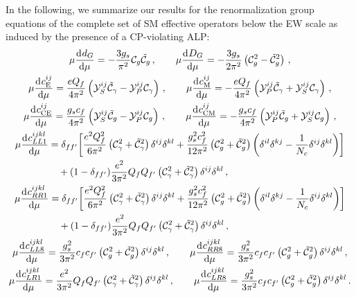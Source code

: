 In the following, we summarize our results for
the renormalization group equations of the complete set of SM effective operators below the EW scale as induced by the presence of a CP-violating ALP:
%
\begin{gather}
    \mu \dv[]{d_G}{\mu} = - \frac{3g_s}{\pi^2}\mathcal{C}_g \tilde{\mathcal{C}}_g\,,
    \qquad
    \mu \dv[]{D_G}{\mu} = -\frac{3g_s}{2\pi^2}\left(\mathcal{C}_g^2 - \tilde{\mathcal{C}}_g^2\right)\,,
    \\
    \mu\dv[]{c_{\rm E}^{ij}}{\mu} =  \frac{e Q_f}{4 \pi^2} \left( \mathcal{Y}_S^{ij} \tilde{\mathcal{C}}_\gamma-\mathcal{Y}_P^{ij} \mathcal{C}_\gamma  \right) \,,
    \qquad
    \mu\dv[]{c_{\rm M}^{ij}}{\mu} = - \frac{e Q_f}{4 \pi^2} \left(\mathcal{Y}_P^{ij} \tilde{\mathcal{C}}_\gamma  + \mathcal{Y}_S^{ij} \mathcal{C}_\gamma\right) \,,
    \\
    \mu\dv[]{c_{\rm CE}^{ij}}{\mu} = \frac{g_s c_f}{4 \pi^2} \left( \mathcal{Y}_S^{ij} \tilde{\mathcal{C}}_g-\mathcal{Y}_P^{ij} \mathcal{C}_g  \right) \,,
    \qquad
    \mu\dv[]{c_{\rm CM}^{ij}}{\mu} = -\frac{g_s c_f}{4 \pi^2} \left(\mathcal{Y}_P^{ij} \tilde{\mathcal{C}}_g  + \mathcal{Y}_S^{ij} \mathcal{C}_g\right) \,,\\
    \begin{aligned}
    \mu\dv[]{c_{LL1}^{ijkl}}{\mu} &=  \delta_{ff'}\bigg[\frac{e^2Q_f^2}{6\pi^2}\left(\mathcal C_\gamma^2 + \tilde{\mathcal C}_\gamma^2\right)\delta^{ij}\delta^{kl}+\frac{g_s^2c_f^2}{12\pi^2}\left(\mathcal C_g^2 + \tilde{\mathcal C}_g^2\right)\bigg(\delta^{il}\delta^{kj}-\frac{1}{N_c}\delta^{ij}\delta^{kl}\bigg) \bigg] \\&\quad + (1-\delta_{ff'})\frac{e^2}{3\pi^2}Q_f Q_{f'}\left(\mathcal C_\gamma^2 + \tilde{\mathcal C}_\gamma^2\right)\delta^{ij}\delta^{kl}\,, 
    \end{aligned}\\
    \begin{aligned}
    \mu\dv[]{c_{RR1}^{ijkl}}{\mu} &= \delta_{ff'}\bigg[\frac{e^2Q_f^2}{6\pi^2}\left(\mathcal C_\gamma^2 + \tilde{\mathcal C}_\gamma^2\right)\delta^{ij}\delta^{kl}+\frac{g_s^2c_f^2}{12\pi^2}\left(\mathcal C_g^2 + \tilde{\mathcal C}_g^2\right)\bigg(\delta^{il}\delta^{kj}-\frac{1}{N_c}\delta^{ij}\delta^{kl}\bigg) \bigg] \\&\quad+ (1-\delta_{ff'})\frac{e^2}{3\pi^2}Q_f Q_{f'}\left(\mathcal C_\gamma^2 + \tilde{\mathcal C}_\gamma^2\right)\delta^{ij}\delta^{kl}\,, 
    \end{aligned}\\
    \mu\dv[]{c_{LL8}^{ijkl}}{\mu} = \frac{g_s^2}{3\pi^2}c_f c_{f'}\left(\mathcal C_g^2 + \tilde{\mathcal C}_g^2\right)\delta^{ij}\delta^{kl}\,,
    \qquad
    \mu\dv[]{c_{RR8}^{ijkl}}{\mu} = \frac{g_s^2}{3\pi^2}c_f c_{f'}\left(\mathcal C_g^2 + \tilde{\mathcal C}_g^2\right)\delta^{ij}\delta^{kl}\,,\\
    \mu\dv[]{c_{LR1}^{ijkl}}{\mu} = \frac{e^2}{3\pi^2}Q_f Q_{f'}\left(\mathcal C_\gamma^2 + \tilde{\mathcal C}_\gamma^2\right)\delta^{ij}\delta^{kl}\,,
    \qquad
    \mu\dv[]{c_{LR8}^{ijkl}}{\mu} = \frac{g_s^2}{3\pi^2}c_f c_{f'}\left(\mathcal C_g^2 + \tilde{\mathcal C}_g^2\right)\delta^{ij}\delta^{kl}\,.
\end{gather}

